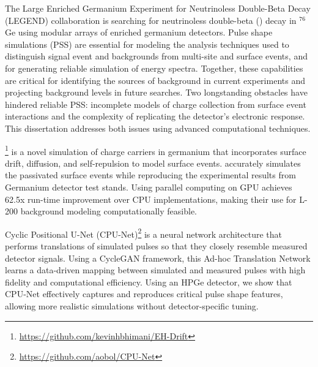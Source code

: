 The Large Enriched Germanium Experiment for Neutrinoless Double-Beta Decay (LEGEND) collaboration is searching for neutrinoless double-beta ({\onbb}) decay in ${}^{76}$Ge using modular arrays of enriched germanium detectors. Pulse shape simulations (PSS) are essential for modeling the analysis techniques used to distinguish signal event and backgrounds from multi-site and surface events, and for generating reliable simulation of energy spectra. Together, these capabilities are critical for identifying the sources of background in current experiments and projecting background levels in future searches. Two longstanding obstacles have hindered reliable PSS: incomplete models of charge collection from surface event interactions and the complexity of replicating the detector’s electronic response. This dissertation addresses both issues using advanced computational techniques.

{\ehd}\footnote{\url{https://github.com/kevinhbhimani/EH-Drift}} is a novel simulation of charge carriers in germanium that incorporates surface drift, diffusion, and self-repulsion to model surface events. {\ehd} accurately simulates the passivated surface events while reproducing the experimental results from Germanium detector test stands. Using parallel computing on GPU {\ehd} achieves 62.5x run-time improvement over CPU implementations, making their use for L-200 background modeling computationally feasible.

Cyclic Positional U-Net (CPU-Net)\footnote{\url{https://github.com/aobol/CPU-Net}} is a neural network architecture that performs translations of simulated pulses so that they closely resemble measured detector signals. Using a CycleGAN framework, this Ad-hoc Translation Network learns a data-driven mapping between simulated and measured pulses with high fidelity and computational efficiency. Using an HPGe detector, we show that CPU-Net effectively captures and reproduces critical pulse shape features, allowing more realistic simulations without detector-specific tuning.